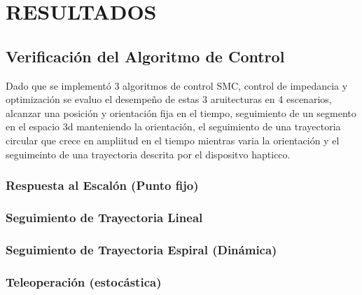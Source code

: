 \chapter{RESULTADOS}
\section{Verificación del Algoritmo de Control} %

Dado que se implementó 3 algoritmos de control SMC, control de impedancia y  optimización se evaluo el desempeño de estas 3 aruitecturas en 4 escenarios, alcanzar una posición y orientación fija en el tiempo, seguimiento de un segmento en el espacio 3d manteniendo la orientación,  el seguimiento de una trayectoria circular que crece en ampliitud en el tiempo mientras varia la orientación y el seguimeinto de una trayectoria descrita por el dispositvo hapticco.


\subsection{Respuesta al Escalón (Punto fijo)}
\subsection{Seguimiento de Trayectoria Lineal}
\subsection{Seguimiento de Trayectoria Espiral (Dinámica)}
\subsection{Teleoperación (estocástica)}


\begin{table}[H]
\centering
\caption{Comparativa de desempeño de los controladores en simulación (Métricas promedio)}
\label{tab:comparativa_controladores}
\end{table}

